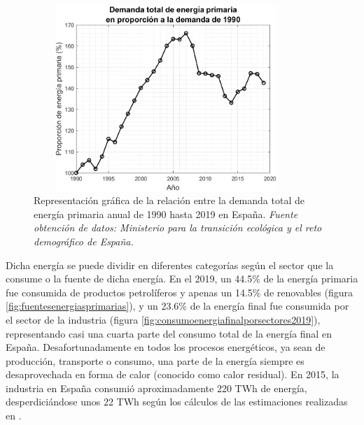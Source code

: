 \begin{figure}[H]
	\centering
	\includegraphics[width=10cm, height=7cm]{figuras/DemandaEnergiaPrimariaProporcion1990}
	\caption[Relación entre demanda total de energía primaria anual]{Representación gráfica de la relación entre la demanda total de energía primaria anual de 1990 hasta 2019 en España. \textit{Fuente obtención de datos: Ministerio para la transición ecológica y el reto demográfico de España.} }
	\label{fig:demandaenergiaprimariaproporcion1990}
\end{figure}
Dicha energía se puede dividir en diferentes categorías según el sector que la consume o la fuente de dicha energía. En el 2019, un 44.5\% de la energía primaria fue consumida de productos petrolíferos y apenas un 14.5\% de renovables (figura \ref{fig:fuentesenergiasprimarias}), y un 23.6\% de la energía final fue consumida por el sector de la industria (figura \ref{fig:consumoenergiafinalporsectores2019}), representando casi una cuarta parte del consumo total de la energía final en España. Desafortunadamente en todos los procesos energéticos, ya sean de producción, transporte o consumo, una parte de la energía siempre es desaprovechada en forma de calor (conocido como calor residual). En 2015, la industria en España consumió aproximadamente 220 TWh de energía, desperdiciándose unos 22 TWh según los cálculos de las estimaciones realizadas en \cite{wasteEnergyindustryEstimate}.

